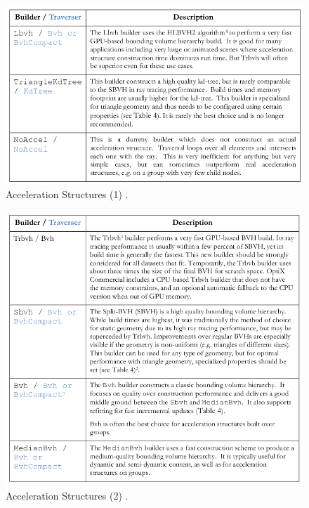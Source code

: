 \begin{figure}[htbp]
	\centering
		\includegraphics[width=\textwidth,height=\textheight,keepaspectratio]{Figures/acc1.png}
	\caption[Acceleration Structures (1)]{Acceleration Structures (1) \citep{Reference6}.}%
	\label{fig:acc1}
\end{figure}
\begin{figure}[htbp]
	\centering
		\includegraphics[width=\textwidth,height=\textheight,keepaspectratio]{Figures/acc2.png}
	\caption[Acceleration Structures (2)]{Acceleration Structures (2) \citep{Reference6}.}%
	\label{fig:acc2}
\end{figure}
